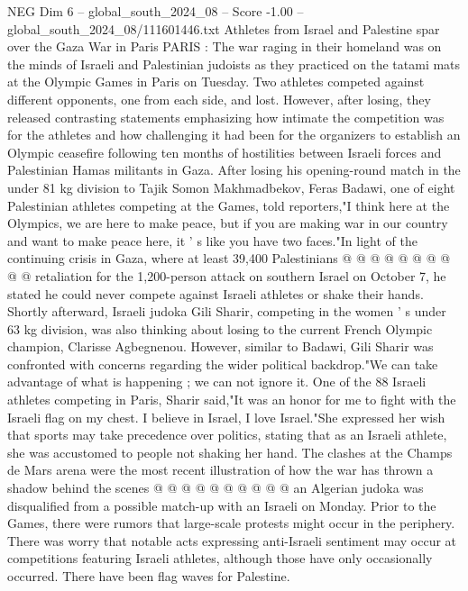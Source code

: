 \begin{textsample}{NEG Dim 6 – global\_south\_2024\_08 – Score -1.00 – global\_south\_2024\_08/111601446.txt}  \label{ex:f6_neg_134}
Athletes from Israel and Palestine spar over the Gaza War in Paris PARIS : The war raging in their homeland was on the minds of Israeli and Palestinian judoists as they practiced on the tatami mats at the Olympic Games in Paris on Tuesday.
Two athletes competed against different opponents, one from each side, and lost.
However, after losing, they released contrasting statements emphasizing how intimate the competition was for the athletes and how challenging it had been for the organizers to establish an Olympic ceasefire following ten months of hostilities between Israeli forces and Palestinian Hamas militants in Gaza.
After losing his opening-round match in the under 81 kg division to Tajik Somon Makhmadbekov, Feras Badawi, one of eight Palestinian athletes competing at the Games, told reporters,"I think here at the Olympics, we are here to make peace, but if you are making war in our country and want to make peace here, it ' s like you have two faces."In light of the continuing crisis in Gaza, where at least 39,400 Palestinians @ @ @ @ @ @ @ @ @ @ retaliation for the 1,200-person attack on southern Israel on October 7, he stated he could never compete against Israeli athletes or shake their hands.
Shortly afterward, Israeli judoka Gili Sharir, competing in the women ' s under 63 kg division, was also thinking about losing to the current French Olympic champion, Clarisse Agbegnenou.
However, similar to Badawi, Gili Sharir was confronted with concerns regarding the wider political backdrop."We can take advantage of what is happening ; we can not ignore it.
One of the 88 Israeli athletes competing in Paris, Sharir said,"It was an honor for me to fight with the Israeli flag on my chest.
I believe in Israel, I love Israel."She expressed her wish that sports may take precedence over politics, stating that as an Israeli athlete, she was accustomed to people not shaking her hand.
The clashes at the Champs de Mars arena were the most recent illustration of how the war has thrown a shadow behind the scenes @ @ @ @ @ @ @ @ @ @ an Algerian judoka was disqualified from a possible match-up with an Israeli on Monday.
Prior to the Games, there were rumors that large-scale protests might occur in the periphery.
There was worry that notable acts expressing anti-Israeli sentiment may occur at competitions featuring Israeli athletes, although those have only occasionally occurred.
There have been flag waves for Palestine.

\end{textsample}
